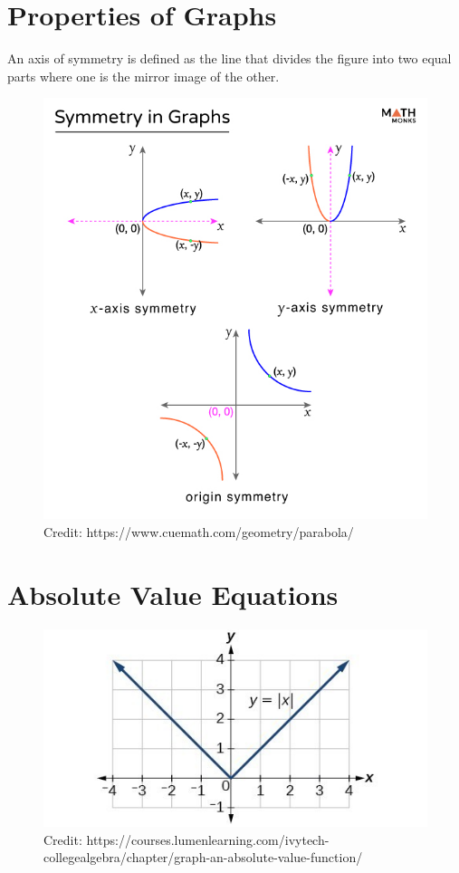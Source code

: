 \documentclass[12pt]{article}
\begin{document}
\section{Properties of Graphs}

An axis of symmetry is defined as the line that divides the figure into two equal parts where one is the mirror image of the other.\\

\begin{figure}[H]
	\centering
	\includegraphics[scale=0.4]{Graph-Symmetry.jpg}
	\caption{Credit: https://www.cuemath.com/geometry/parabola/}
\end{figure}

\section{Absolute Value Equations}

\begin{figure}[H]
	\centering
	\includegraphics[scale=0.3]{CNX_Precalc_Figure_01_06_0032.jpg}
	\caption{Credit: https://courses.lumenlearning.com/ivytech-collegealgebra/chapter/graph-an-absolute-value-function/}
\end{figure}
\end{document}
